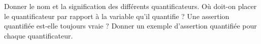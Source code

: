 %
%
	\begin{tasks}
		\task Donner le nom et  la signification des différents quantificateurs.
		\task Où doit-on placer le quantificateur par rapport à la variable qu'il quantifie ?
		\task Une assertion quantifiée est-elle toujours vraie ?
		\task Donner un exemple d'assertion quantifiée  pour chaque quantificateur.
	\end{tasks}

